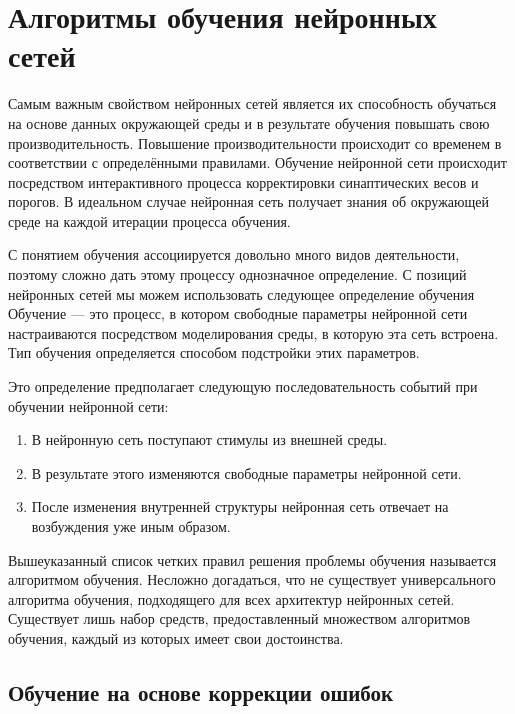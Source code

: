 \section{Алгоритмы обучения нейронных сетей}

Самым важным свойством нейронных сетей является их способность обучаться на основе данных окружающей среды и в  результате обучения повышать свою производительность.
Повышение производительности происходит со временем в соответствии с определёнными правилами.
Обучение нейронной сети происходит посредством интерактивного
процесса корректировки синаптических весов и порогов.
В идеальном случае нейронная сеть получает знания об окружающей среде на каждой итерации процесса обучения.

С понятием обучения ассоциируется довольно много видов деятельности, поэтому сложно дать этому процессу однозначное определение.
С позиций нейронных сетей мы можем использовать следующее определение обучения
Обучение ---  это процесс, в котором свободные параметры нейронной сети настраиваются посредством моделирования среды, в которую эта сеть встроена.
Тип обучения определяется способом подстройки этих параметров. 

Это определение предполагает следующую последовательность событий при обучении нейронной сети:

\begin{enumerate}
	\item В нейронную сеть поступают стимулы из внешней среды.

	\item В результате этого изменяются свободные параметры нейронной сети.

	\item После изменения внутренней структуры нейронная сеть отвечает на возбуждения уже иным образом.
\end{enumerate}

Вышеуказанный список четких правил решения проблемы обучения называется алгоритмом обучения. 
Несложно догадаться, что не существует универсального алгоритма обучения, подходящего для всех архитектур нейронных сетей.
Существует лишь набор средств, предоставленный множеством алгоритмов обучения, каждый из которых имеет свои достоинства.\cite{NejronnyeSeti}

\subsection{Обучение на основе коррекции ошибок}

